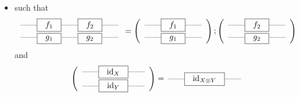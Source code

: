 \documentclass[
		head_space=20mm,
		foot_space=20mm,
		gutter=10mm,
		line_length=190mm
]{jlreq}
\begin{document}
\begin{definition}[モノイダル圏]
\begin{itemize}
\begin{itemize}
			in another notation, 
			\begin{prooftree}
			\end{prooftree}
			\item[\bullet~] such that 
			\begin{align*}
				\begin{array}{c}
					\overset{}{\textrm{------}}\textrm{\fbox{~~$f_1$~~}}\overset{}{\textrm{------}}\textrm{\fbox{~~$f_2$~~}}\overset{}{\textrm{------}} \\[3pt]
					\overset{}{\textrm{------}}\textrm{\fbox{~~$g_1$~~}}\overset{}{\textrm{------}}\textrm{\fbox{~~$g_2$~~}}\overset{}{\textrm{------}}
				\end{array}
				= 
				\left(
					\begin{array}{c}
						\overset{}{\textrm{------}}\textrm{\fbox{~~$f_1$~~}}\overset{}{\textrm{------}}\\[3pt]
						\overset{}{\textrm{------}}\textrm{\fbox{~~$g_1$~~}}\overset{}{\textrm{------}}
					\end{array}
				\right) ;
				\left(
					\begin{array}{c}
						\overset{}{\textrm{------}}\textrm{\fbox{~~$f_2$~~}}\overset{}{\textrm{------}}\\[3pt]
						\overset{}{\textrm{------}}\textrm{\fbox{~~$g_2$~~}}\overset{}{\textrm{------}}
					\end{array}
				\right)
			\end{align*}
			and 
			\begin{align*}
				\left(
					\begin{array}{c}
						\overset{}{\textrm{------}}\textrm{\fbox{~~$\id_X$~~}}\overset{}{\textrm{------}}\\[3pt]
						\overset{}{\textrm{------}}\textrm{\fbox{~~$\id_Y$~~}}\overset{}{\textrm{------}}
					\end{array}
				\right) =\,
				\overset{}{\textrm{------}}\textrm{\fbox{~~$\id_{X\otimes Y}$~~}}\overset{}{\textrm{------}}

\end{align*}
\end{itemize}
\end{itemize}
\end{definition}
\end{document}
